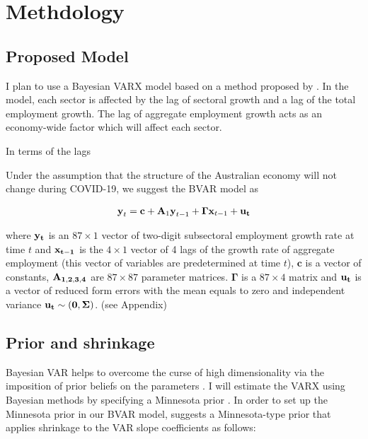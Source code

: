 \documentclass{monashthesis}
\begin{document}
\clearpage

\hypertarget{methdology}{%
\chapter{Methdology}\label{methdology}}

\hypertarget{proposed-model}{%
\section{Proposed Model}\label{proposed-model}}

I plan to use a Bayesian VARX model based on a method proposed by \textcite{anderson2020}. In the model, each sector is affected by the lag of sectoral growth and a lag of the total employment growth. The lag of aggregate employment growth acts as an economy-wide factor which will affect each sector.

In terms of the lags

Under the assumption that the structure of the Australian economy will not change during COVID-19, we suggest the BVAR model as

\[
\begin{aligned}
\textbf{y}_t=\textbf{c}+\textbf{A}_1 \textbf{y}_{t-1}+\boldsymbol{\Gamma}\textbf{x}_{t-1}+\bf{u}_t
\end{aligned}
\]

where \(\bf{y}_t\) is an \(87\times1\) vector of two-digit subsectoral employment growth rate at time \(t\) and \(\bf{x}_{t-1}\) is the \(4\times1\) vector of 4 lags of the growth rate of aggregate employment (this vector of variables are predetermined at time \(t\)), \(\textbf{c}\) is a vector of constants, \(\bf{A}_{1,2,3,4}\) are \(87\times87\) parameter matrices. \(\boldsymbol{\Gamma}\) is a \(87\times4\) matrix and \(\bf{u}_t\) is a vector of reduced form errors with the mean equals to zero and independent variance \(\bf{u}_t \sim (0,\boldsymbol{\Sigma})\). (see Appendix)

\hypertarget{prior-and-shrinkage}{%
\section{Prior and shrinkage}\label{prior-and-shrinkage}}

Bayesian VAR helps to overcome the curse of high dimensionality via the imposition of prior beliefs on the parameters \autocite{banbura2010large}. I will estimate the VARX using Bayesian methods by specifying a Minnesota prior \autocites[e.g.][]{anderson2020,litterman1986,robertson1999vector}. In order to set up the Minnesota prior in our BVAR model, \textcite{banbura2010large} suggests a Minnesota-type prior that applies shrinkage to the VAR slope coefficients as follows:
\end{document}
